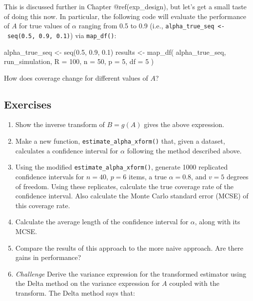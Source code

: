 \documentclass[
]{book}
\newenvironment{Shaded}{\begin{snugshade}}{\end{snugshade}}
\newcommand{\AttributeTok}[1]{\textcolor[rgb]{0.77,0.63,0.00}{#1}}
\newcommand{\DecValTok}[1]{\textcolor[rgb]{0.00,0.00,0.81}{#1}}
\newcommand{\FloatTok}[1]{\textcolor[rgb]{0.00,0.00,0.81}{#1}}
\newcommand{\FunctionTok}[1]{\textcolor[rgb]{0.00,0.00,0.00}{#1}}
\newcommand{\NormalTok}[1]{#1}
\newcommand{\OtherTok}[1]{\textcolor[rgb]{0.56,0.35,0.01}{#1}}
\begin{document}
This is discussed further in Chapter @ref(exp\_design), but let's get a small taste of doing this now.
In particular, the following code will evaluate the performance of \(A\) for true values of \(\alpha\) ranging from 0.5 to 0.9 (i.e., \texttt{alpha\_true\_seq\ \textless{}-\ seq(0.5,\ 0.9,\ 0.1)}) via \texttt{map\_df()}:

\begin{Shaded}
\begin{Highlighting}[]
\NormalTok{alpha\_true\_seq }\OtherTok{\textless{}{-}} \FunctionTok{seq}\NormalTok{(}\FloatTok{0.5}\NormalTok{, }\FloatTok{0.9}\NormalTok{, }\FloatTok{0.1}\NormalTok{)}
\NormalTok{results }\OtherTok{\textless{}{-}} \FunctionTok{map\_df}\NormalTok{( alpha\_true\_seq, }
\NormalTok{                   run\_simulation,}
                   \AttributeTok{R =} \DecValTok{100}\NormalTok{,}
                   \AttributeTok{n =} \DecValTok{50}\NormalTok{, }\AttributeTok{p =} \DecValTok{5}\NormalTok{, }\AttributeTok{df =} \DecValTok{5}\NormalTok{ )}
\end{Highlighting}
\end{Shaded}

How does coverage change for different values of \(A\)?

\hypertarget{exercises-3}{%
\subsection{Exercises}\label{exercises-3}}

\begin{enumerate}
\def\labelenumi{\arabic{enumi}.}
\item
  Show the inverse transform of \(B = g(A)\) gives the above expression.
\item
  Make a new function, \texttt{estimate\_alpha\_xform()} that, given a dataset, calculates a confidence interval for \(\alpha\) following the method described above.
\item
  Using the modified \texttt{estimate\_alpha\_xform()}, generate 1000 replicated confidence intervals for \(n = 40\), \(p = 6\) items, a true \(\alpha = 0.8\), and \(v = 5\) degrees of freedom. Using these replicates, calculate the true coverage rate of the confidence interval. Also calculate the Monte Carlo standard error (MCSE) of this coverage rate.
\item
  Calculate the average length of the confidence interval for \(\alpha\), along with its MCSE.
\item
  Compare the results of this approach to the more naive approach. Are there gains in performance?
\item
  \emph{Challenge} Derive the variance expression for the transformed estimator using the Delta method on the variance expression for \(A\) coupled with the transform. The Delta method says that:
\end{enumerate}
\end{document}
